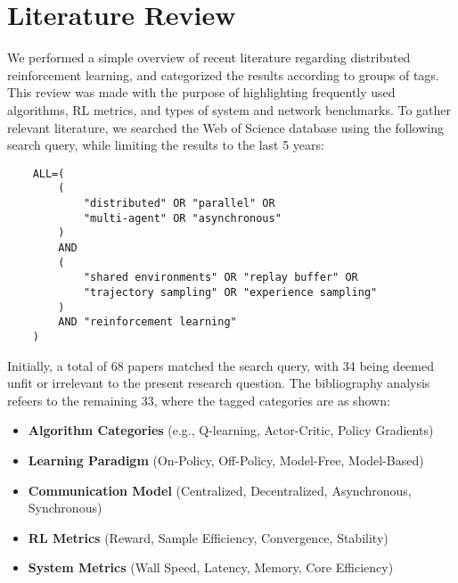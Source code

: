 \section{Literature Review}
\label{sec:literature_review}

We performed a simple overview of recent literature regarding distributed reinforcement learning,
and categorized the results according to groups of tags.
This review was made with the purpose of highlighting frequently used algorithms, RL metrics,
and types of system and network benchmarks.
To gather relevant literature, we searched the Web of Science database using the following search query,
while limiting the results to the last 5 years:

\begin{verbatim}
    ALL=(
        (
            "distributed" OR "parallel" OR
            "multi-agent" OR "asynchronous"
        )
        AND
        (
            "shared environments" OR "replay buffer" OR
            "trajectory sampling" OR "experience sampling"
        )
        AND "reinforcement learning"
    )
\end{verbatim}

Initially, a total of 68 papers matched the search query, with 34 being deemed unfit or irrelevant to the
present research question.
The bibliography analysis refeers to the remaining 33, where the tagged categories are as shown:

\begin{itemize}[leftmargin=*, label={--}]
    \item \textbf{Algorithm Categories} (e.g., Q-learning, Actor-Critic, Policy Gradients)
    \item \textbf{Learning Paradigm} (On-Policy, Off-Policy, Model-Free, Model-Based)
    \item \textbf{Communication Model} (Centralized, Decentralized, Asynchronous, Synchronous)
    \item \textbf{RL Metrics} (Reward, Sample Efficiency, Convergence, Stability)
    \item \textbf{System Metrics} (Wall Speed, Latency, Memory, Core Efficiency)
\end{itemize}

